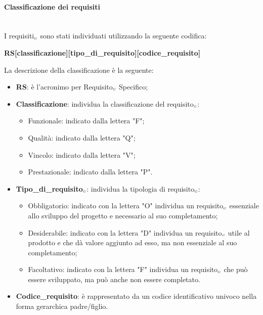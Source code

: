 \paragraph{Classificazione dei requisiti}\label{ProcessiPrimariProspettiveAnalisiDeiRequisitiClassificazioneDeiRequisiti}\mbox{}\\%
I requisiti$_{\scaleto{G}{3pt}}$ sono stati individuati utilizzando la seguente codifica:
\begin{center}
	\textbf{RS[classificazione][tipo\_di\_requisito][codice\_requisito]}
\end{center} 
La descrizione della classificazione è la seguente:
\begin{itemize}
	\item \textbf{RS}: è l'acronimo per Requisito$_{\scaleto{G}{3pt}}$ Specifico;
	\item \textbf{Classificazione}: individua la classificazione del requisito$_{\scaleto{G}{3pt}}$:
	\begin{itemize}
		\item Funzionale: indicato dalla lettera "F";
		\item Qualità: indicato dalla lettera "Q";
		\item Vincolo: indicato dalla lettera "V";
		\item Prestazionale: indicato dalla lettera "P".
	\end{itemize}
	\item \textbf{Tipo\_di\_requisito$_{\scaleto{G}{3pt}}$}: individua la tipologia di requisito$_{\scaleto{G}{3pt}}$:
	\begin{itemize}
		\item Obbligatorio: indicato con la lettera "O" individua un requisito$_{\scaleto{G}{3pt}}$ essenziale allo sviluppo del progetto e necessario al suo completamento;
		\item Desiderabile: indicato con la lettera "D" individua un requisito$_{\scaleto{G}{3pt}}$ utile al prodotto e che dà valore aggiunto ad esso, ma non essenziale al suo completamento;
		\item Facoltativo: indicato con la lettera "F" individua un requisito$_{\scaleto{G}{3pt}}$ che può essere sviluppato, ma può anche non essere completato.
	\end{itemize}
	\item \textbf{Codice\_requisito}: è rappresentato da un codice identificativo univoco nella forma gerarchica padre/figlio.
\end{itemize}
